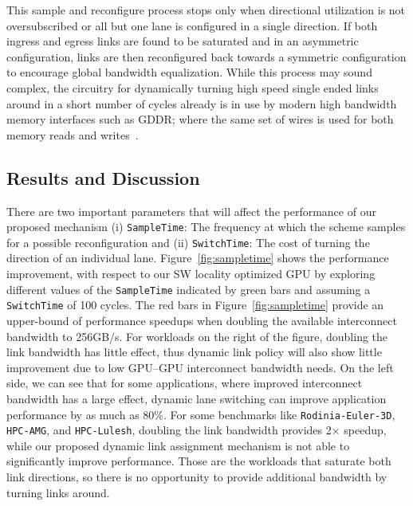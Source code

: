 This sample and 
reconfigure process stops only when directional utilization is not 
oversubscribed or all but one lane is configured in a single direction. If 
both ingress and egress links are found to be saturated and in an asymmetric 
configuration, links are then reconfigured back towards a symmetric configuration 
to encourage global bandwidth equalization. While this process may sound 
complex, the circuitry for dynamically turning high speed single ended links 
around in a short number of cycles already is in use by modern high bandwidth 
memory interfaces such as GDDR; where the same set of wires is used for both memory reads 
and writes~\cite{hynixgddr51Gb}.

\subsection{Results and Discussion} 

There are two important parameters that will affect the performance of
our proposed mechanism (i)
\texttt{SampleTime}: The frequency at which the scheme samples for a possible
reconfiguration and (ii) \texttt{SwitchTime}: The cost of turning the
direction of an individual lane. Figure~\ref{fig:sampletime} shows the 
performance improvement, with
respect to our SW locality optimized GPU by exploring different values of the
\texttt{SampleTime} indicated by green bars and assuming a \texttt{SwitchTime}
of 100 cycles. The red bars in Figure~\ref{fig:sampletime} provide an
upper-bound of performance speedups when doubling the available interconnect
bandwidth to 256GB/s. For workloads on the right of the figure, doubling the link
bandwidth has little effect, thus dynamic link policy will also show little
improvement due to low GPU--GPU interconnect bandwidth needs.
On the left side, we can see that for some
applications, where improved interconnect bandwidth has a large effect,
dynamic lane switching can improve application performance by as much as 80\%.
For some benchmarks like \texttt{Rodinia-Euler-3D}, \texttt{HPC-AMG}, and 
\texttt{HPC-Lulesh}, doubling the link bandwidth provides 2$\times$ 
speedup, while our proposed dynamic link assignment mechanism is not 
able to significantly improve performance. Those are the workloads 
that saturate both link directions, so there is no opportunity to 
provide additional bandwidth by turning links around.

